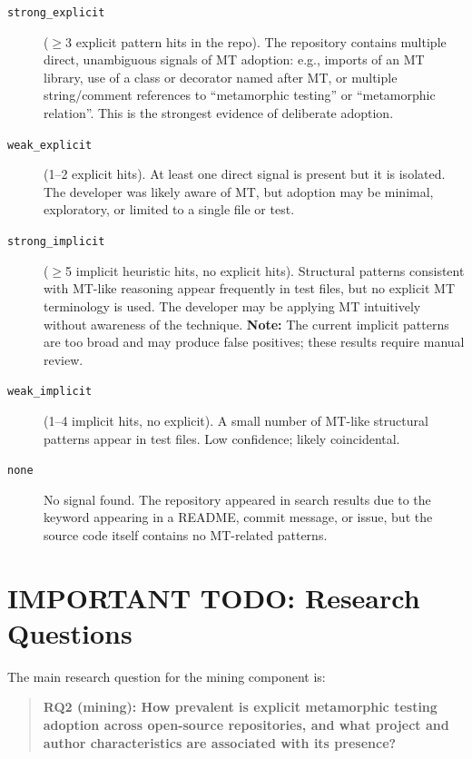 \documentclass[12pt,a4paper]{article}
\begin{document}
\begin{description}
  \item[\texttt{strong\_explicit}] ($\geq$3 explicit pattern hits in the repo).
    The repository contains multiple direct, unambiguous signals of MT adoption:
    e.g., imports of an MT library, use of a class or decorator named after MT,
    or multiple string/comment references to ``metamorphic testing'' or
    ``metamorphic relation''. This is the strongest evidence of deliberate
    adoption.

  \item[\texttt{weak\_explicit}] (1--2 explicit hits). At least one direct signal
    is present but it is isolated. The developer was likely aware of MT, but
    adoption may be minimal, exploratory, or limited to a single file or test.

  \item[\texttt{strong\_implicit}] ($\geq$5 implicit heuristic hits, no explicit
    hits). Structural patterns consistent with MT-like reasoning appear
    frequently in test files, but no explicit MT terminology is used. The
    developer may be applying MT intuitively without awareness of the technique.
    \textbf{Note:} The current implicit patterns are too broad and may produce
    false positives; these results require manual review.

  \item[\texttt{weak\_implicit}] (1--4 implicit hits, no explicit). A small number
    of MT-like structural patterns appear in test files. Low confidence; likely
    coincidental.

  \item[\texttt{none}] No signal found. The repository appeared in search results
    due to the keyword appearing in a README, commit message, or issue, but
    the source code itself contains no MT-related patterns.
\end{description}

\section{IMPORTANT TODO: Research Questions}
\label{sec:rqs}

The main research question for the mining component is:

\begin{quote}
  \textbf{RQ2 (mining): How prevalent is explicit metamorphic testing adoption
  across open-source repositories, and what project and author characteristics
  are associated with its presence?}
\end{quote}
\end{document}
